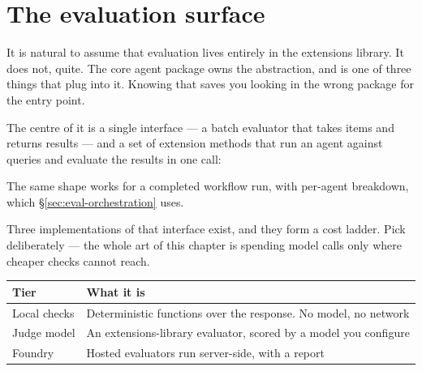 \section{The evaluation surface}
\label{sec:eval-surface}

It is natural to assume that evaluation lives entirely in the extensions
library. It does not, quite. The core agent package owns the abstraction, and
 is one of three things that plug into
it. Knowing that saves you looking in the wrong package for the entry point.

The centre of it is a single interface --- a batch evaluator that takes items and
returns results --- and a set of extension methods that run an agent against
queries and evaluate the results in one call:


The same shape works for a completed workflow run, with per-agent breakdown,
which \S\ref{sec:eval-orchestration} uses.

Three implementations of that interface exist, and they form a cost ladder. Pick
deliberately --- the whole art of this chapter is spending model calls only where
cheaper checks cannot reach.

\begin{center}
\small
\begin{tabularx}{\linewidth}{@{}lX@{}}
\toprule
\textbf{Tier} & \textbf{What it is} \\
\midrule
Local checks & Deterministic functions over the response. No model, no network \\[4pt]
Judge model & An extensions-library evaluator, scored by a model you configure \\[4pt]
Foundry & Hosted evaluators run server-side, with a report \\
\bottomrule
\end{tabularx}
\end{center}

